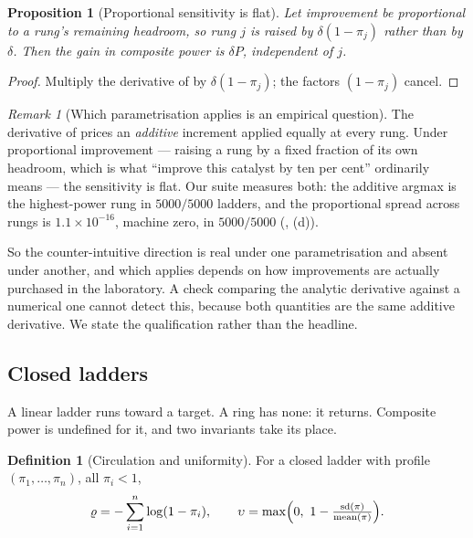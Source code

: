 \documentclass[11pt,twocolumn,a4paper]{article}
\theoremstyle{thmstyle}
\newtheorem{proposition}[theorem]{Proposition}
\theoremstyle{definition}
\newtheorem{definition}[theorem]{Definition}
\theoremstyle{remark}
\newtheorem{remark}[theorem]{Remark}
\newcommand{\pow}{\pi}
\newcommand{\circu}{\varrho}
\newcommand{\unif}{\upsilon}
\begin{document}
\begin{proposition}[Proportional sensitivity is flat]
\label{prop:proportional}
Let improvement be proportional to a rung's remaining headroom, so rung $j$ is
raised by $\delta(1-\pow_j)$ rather than by $\delta$. Then the gain in
composite power is $\delta P$, independent of $j$.
\end{proposition}

\begin{proof}
Multiply the derivative of  by $\delta(1-\pow_j)$; the
factors $(1-\pow_j)$ cancel.
\end{proof}

\begin{remark}[Which parametrisation applies is an empirical question]
\label{rem:sens-honest}
The derivative of  prices an \emph{additive} increment
applied equally at every rung. Under proportional improvement --- raising a
rung by a fixed fraction of its own headroom, which is what ``improve this
catalyst by ten per cent'' ordinarily means --- the sensitivity is flat. Our
suite measures both: the additive argmax is the highest-power rung in
$5000/5000$ ladders, and the proportional spread across rungs is
$1.1\times10^{-16}$, machine zero, in $5000/5000$
(, (d)).

So the counter-intuitive direction is real under one parametrisation and
absent under another, and which applies depends on how improvements are
actually purchased in the laboratory. A check comparing the analytic
derivative against a numerical one cannot detect this, because both quantities
are the same additive derivative. We state the qualification rather than the
headline.
\end{remark}

\subsection{Closed ladders}
\label{sec:closed}

A linear ladder runs toward a target. A ring has none: it returns. Composite
power is undefined for it, and two invariants take its place.

\begin{definition}[Circulation and uniformity]
\label{def:invariants}
For a closed ladder with profile $(\pow_1,\dots,\pow_n)$, all $\pow_i<1$,
\begin{equation}
\circu = -\sum_{i=1}^n \log(1-\pow_i),
\qquad
\unif = \max\Bigl(0,\ 1-\tfrac{\mathrm{sd}(\pow)}{\mathrm{mean}(\pow)}\Bigr).
\label{eq:invariants}
\end{equation}
\end{definition}
\end{document}

